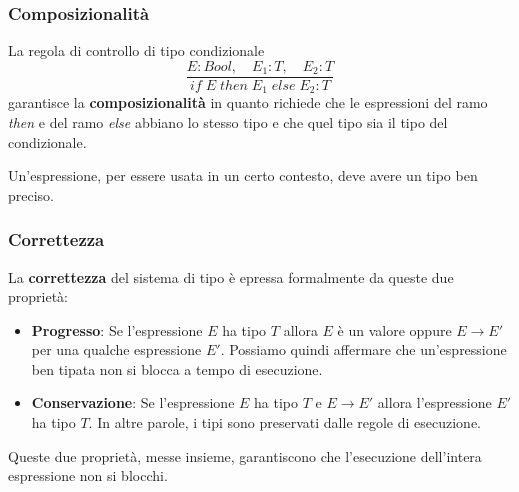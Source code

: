 \subsubsection{Composizionalità}
La regola di controllo di tipo condizionale
\[ \frac{E : Bool, \quad E_1 : T, \quad E_2 : T}{if \; E \; then \; E_1 \; else \; E_2 : T} \]
garantisce la \textbf{composizionalità} in quanto richiede che le espressioni del ramo \emph{then} e del ramo \emph{else}
abbiano lo stesso tipo e che quel tipo sia il tipo del condizionale.

Un'espressione, per essere usata in un certo contesto, deve avere un tipo ben preciso.

\subsubsection{Correttezza}
La \textbf{correttezza} del sistema di tipo è epressa formalmente da queste due proprietà:
\begin{itemize}
	\item \textbf{Progresso}: Se l'espressione $E$ ha tipo $T$ allora $E$ è un valore oppure $E \rightarrow E'$ per una
	      qualche espressione $E'$. Possiamo quindi affermare che un'espressione ben tipata non si blocca a tempo di
	      esecuzione.
	\item \textbf{Conservazione}: Se l'espressione $E$ ha tipo $T$ e $E \rightarrow E'$ allora l'espressione $E'$ ha
	      tipo $T$. In altre parole, i tipi sono preservati dalle regole di esecuzione.
\end{itemize}
Queste due proprietà, messe insieme, garantiscono che l'esecuzione dell'intera espressione non si blocchi.
